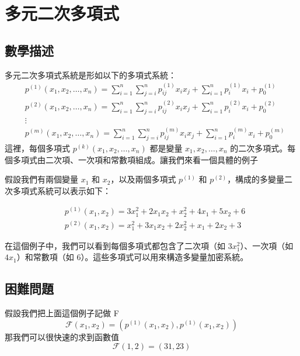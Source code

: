 \documentclass[
]{article}
\author{}
\date{}
\begin{document}
\hypertarget{ux591aux5143ux4e8cux6b21ux591aux9805ux5f0f}{%
\section{多元二次多項式}\label{ux591aux5143ux4e8cux6b21ux591aux9805ux5f0f}}

\hypertarget{ux6578ux5b78ux63cfux8ff0}{%
\subsection{數學描述}\label{ux6578ux5b78ux63cfux8ff0}}

多元二次多項式系統是形如以下的多項式系統： \[
\begin{aligned}
& p^{(1)}\left(x_1, x_2, \ldots, x_n\right)= \sum_{i=1}^n \sum_{j=i}^n p_{i j}^{(1)} x_i x_j+\sum_{i=1}^n p_i^{(1)} x_i+p_0^{(1)} \\
& p^{(2)}\left(x_1, x_2, \ldots, x_n\right)= \sum_{i=1}^n \sum_{j=i}^n p_{i j}^{(2)} x_i x_j+\sum_{i=1}^n p_i^{(2)} x_i+p_0^{(2)} \\
& \vdots \\
& p^{(m)}\left(x_1, x_2, \ldots, x_n\right)=\sum_{i=1}^n \sum_{j=i}^n p_{i j}^{(m)} x_i x_j+\sum_{i=1}^n p_i^{(m)} x_i+p_0^{(m)}
\end{aligned}
\] 這裡，每個多項式 \(p^{(k)}(x_1, x_2, \ldots, x_n)\) 都是變量
\(x_1, x_2, \ldots, x_n\)
的二次多項式。每個多項式由二次項、一次項和常數項組成。讓我們來看一個具體的例子

假設我們有兩個變量 \(x_1\) 和 \(x_2\)，以及兩個多項式 \(p^{(1)}\) 和
\(p^{(2)}\)，構成的多變量二次多項式系統可以表示如下：

\[
\begin{aligned}
& p^{(1)}\left(x_1, x_2\right)=3 x_1^2+2 x_1 x_2+x_2^2+4 x_1+5 x_2+6 \\
& p^{(2)}\left(x_1, x_2\right)=x_1^2+3 x_1 x_2+2 x_2^2+x_1+2 x_2+3
\end{aligned}
\]

在這個例子中，我們可以看到每個多項式都包含了二次項（如
\(3x_1^2\)）、一次項（如 \(4x_1\)）和常數項（如
\(6\)）。這些多項式可以用來構造多變量加密系統。

\hypertarget{ux56f0ux96e3ux554fux984c}{%
\subsection{困難問題}\label{ux56f0ux96e3ux554fux984c}}

假設我們把上面這個例子記做 F \[
\mathcal{F}(x_{1},x_{2}) = (p^{(1)}(x_{1},x_{2}),p^{(1)}(x_{1},x_{2}))
\] 那我們可以很快速的求到函數值 \[
\mathcal{F}(1,2) = (31,23)
\]
\end{document}
